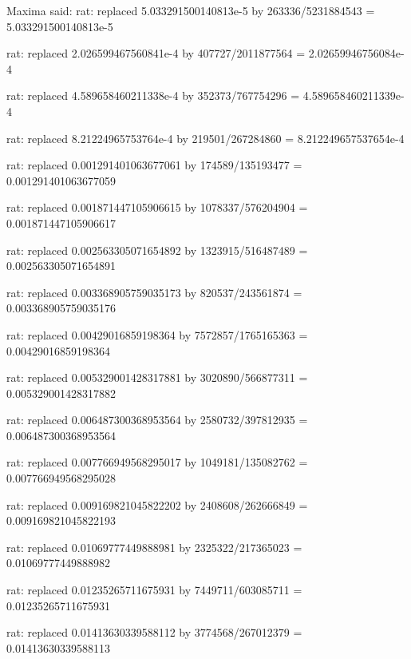 \documentclass[a4paper,10pt]{article}
\begin{document}
\begin{eulernotebook}
\begin{eulercomment}
\begin{eulercomment}
\begin{eulercomment}
\begin{eulercomment}
\begin{eulercomment}
\begin{eulercomment}
\begin{eulercomment}
\begin{eulercomment}
\begin{eulercomment}
\begin{eulercomment}
\begin{eulercomment}
\begin{eulercomment}
\begin{eulercomment}
\begin{eulercomment}
\begin{eulercomment}
\begin{eulercomment}
\begin{euleroutput}
  Maxima said:
  rat: replaced 5.033291500140813e-5 by 263336/5231884543 = 5.033291500140813e-5
  
  rat: replaced 2.026599467560841e-4 by 407727/2011877564 = 2.02659946756084e-4
  
  rat: replaced 4.589658460211338e-4 by 352373/767754296 = 4.589658460211339e-4
  
  rat: replaced 8.21224965753764e-4 by 219501/267284860 = 8.212249657537654e-4
  
  rat: replaced 0.001291401063677061 by 174589/135193477 = 0.001291401063677059
  
  rat: replaced 0.001871447105906615 by 1078337/576204904 = 0.001871447105906617
  
  rat: replaced 0.002563305071654892 by 1323915/516487489 = 0.002563305071654891
  
  rat: replaced 0.003368905759035173 by 820537/243561874 = 0.003368905759035176
  
  rat: replaced 0.00429016859198364 by 7572857/1765165363 = 0.00429016859198364
  
  rat: replaced 0.005329001428317881 by 3020890/566877311 = 0.005329001428317882
  
  rat: replaced 0.006487300368953564 by 2580732/397812935 = 0.006487300368953564
  
  rat: replaced 0.007766949568295017 by 1049181/135082762 = 0.007766949568295028
  
  rat: replaced 0.009169821045822202 by 2408608/262666849 = 0.009169821045822193
  
  rat: replaced 0.01069777449888981 by 2325322/217365023 = 0.01069777449888982
  
  rat: replaced 0.01235265711675931 by 7449711/603085711 = 0.01235265711675931
  
  rat: replaced 0.01413630339588112 by 3774568/267012379 = 0.01413630339588113
  

\end{euleroutput}
\end{eulercomment}
\end{eulercomment}
\end{eulercomment}
\end{eulercomment}
\end{eulercomment}
\end{eulercomment}
\end{eulercomment}
\end{eulercomment}
\end{eulercomment}
\end{eulercomment}
\end{eulercomment}
\end{eulercomment}
\end{eulercomment}
\end{eulercomment}
\end{eulercomment}
\end{eulercomment}
\end{eulernotebook}
\end{document}
